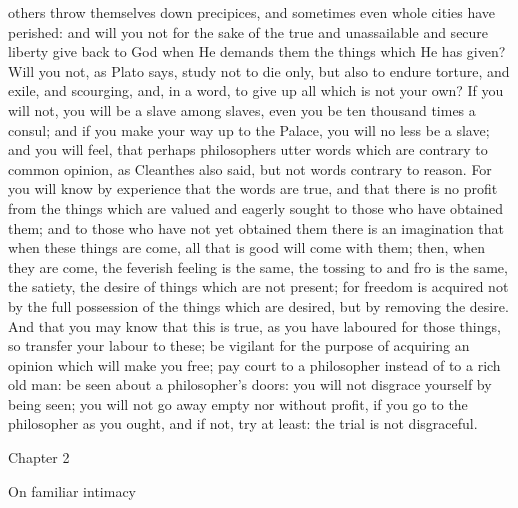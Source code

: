 \documentclass[a4paper]{article}
\begin{document}
others throw themselves down precipices, and sometimes even whole cities have
perished: and will you not for the sake of the true and unassailable and secure
liberty give back to God when He demands them the things which He has given?
Will you not, as Plato says, study not to die only, but also to endure torture,
and exile, and scourging, and, in a word, to give up all which is not your own?
If you will not, you will be a slave among slaves, even you be ten thousand
times a consul; and if you make your way up to the Palace, you will no less be
a slave; and you will feel, that perhaps philosophers utter words which are
contrary to common opinion, as Cleanthes also said, but not words contrary to
reason. For you will know by experience that the words are true, and that there
is no profit from the things which are valued and eagerly sought to those who
have obtained them; and to those who have not yet obtained them there is an
imagination that when these things are come, all that is good will come with
them; then, when they are come, the feverish feeling is the same, the tossing
to and fro is the same, the satiety, the desire of things which are not
present; for freedom is acquired not by the full possession of the things which
are desired, but by removing the desire. And that you may know that this is
true, as you have laboured for those things, so transfer your labour to these;
be vigilant for the purpose of acquiring an opinion which will make you free;
pay court to a philosopher instead of to a rich old man: be seen about a
philosopher's doors: you will not disgrace yourself by being seen; you will not
go away empty nor without profit, if you go to the philosopher as you ought,
and if not, try at least: the trial is not disgraceful.

Chapter 2

On familiar intimacy
\end{document}
